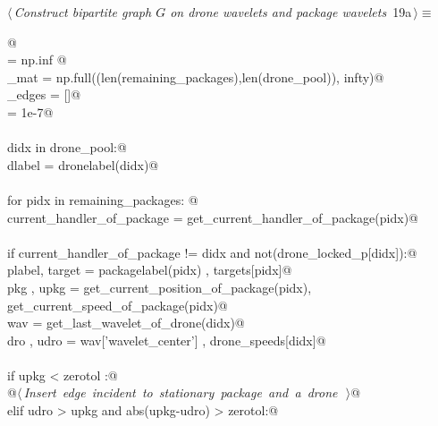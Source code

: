 \documentclass[10pt, english, oneside]{report}
\begin{document}
\begin{flushleft} \small
\begin{minipage}{\linewidth}\label{scrap17}\raggedright\small
{} $\langle\,${\itshape Construct bipartite graph $G$ on drone wavelets and package wavelets}\nobreak\ {\footnotesize {19a}}$\,\rangle\equiv$
\vspace{-1ex}
\begin{list}{}{} \item
\mbox{}\verb@  @\\
\mbox{}\verb@infty       = np.inf @\\
\mbox{}\verb@G_mat       = np.full((len(remaining_packages),len(drone_pool)), infty)@\\
\mbox{}\verb@lbend_edges = []@\\
\mbox{}\verb@zerotol = 1e-7@\\
\mbox{}\verb@@\\
\mbox{}\verb@for didx in drone_pool:@\\
\mbox{}\verb@    dlabel = dronelabel(didx)@\\
\mbox{}\verb@@\\
\mbox{}\verb@    for pidx in remaining_packages: @\\
\mbox{}\verb@        current_handler_of_package = get_current_handler_of_package(pidx)@\\
\mbox{}\verb@@\\
\mbox{}\verb@        if current_handler_of_package != didx and not(drone_locked_p[didx]):@\\
\mbox{}\verb@                plabel, target = packagelabel(pidx)                   , targets[pidx]@\\
\mbox{}\verb@                pkg   , upkg   = get_current_position_of_package(pidx), get_current_speed_of_package(pidx)@\\
\mbox{}\verb@                wav            = get_last_wavelet_of_drone(didx)@\\
\mbox{}\verb@                dro   , udro   = wav['wavelet_center']                , drone_speeds[didx]@\\
\mbox{}\verb@@\\
\mbox{}\verb@                if upkg < zerotol :@\\
\mbox{}\verb@                      @\hbox{$\langle\,${\itshape Insert edge incident to stationary package and a drone}\nobreak\ {\footnotesize {}}$\,\rangle$}\verb@                      @\\
\mbox{}\verb@                elif udro > upkg and abs(upkg-udro) > zerotol:@\\

\end{list}
\end{minipage}
\end{flushleft}
\end{document}
